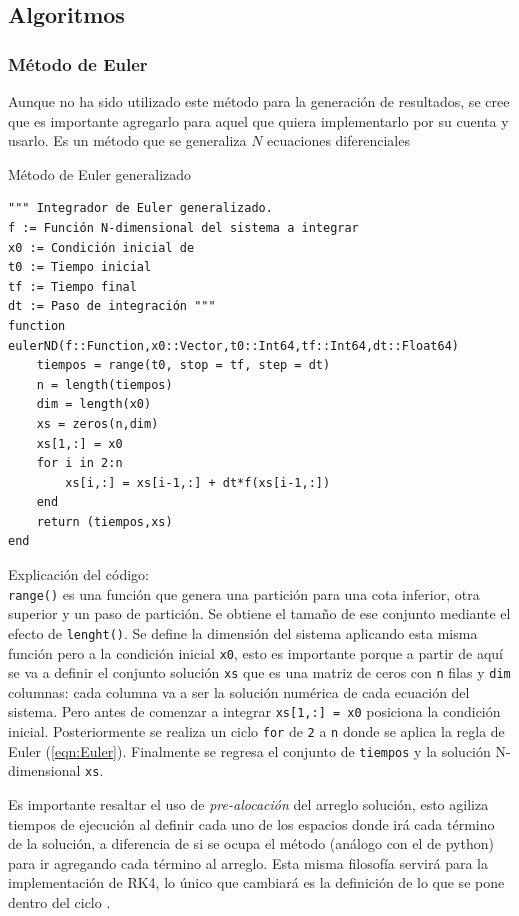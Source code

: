 \subsection{Algoritmos}\label{sec:algoritmos}

\subsubsection{Método de Euler}

Aunque no ha sido utilizado este método para la generación de resultados, se cree que es importante agregarlo para aquel que quiera implementarlo por su cuenta y usarlo. Es un método que se generaliza $N$ ecuaciones diferenciales
\begin{algorithm}
	\caption{Método de Euler generalizado}
	\label{al:Euler}
	\begin{verbatim}
""" Integrador de Euler generalizado.
f := Función N-dimensional del sistema a integrar
x0 := Condición inicial de
t0 := Tiempo inicial
tf := Tiempo final
dt := Paso de integración """
function eulerND(f::Function,x0::Vector,t0::Int64,tf::Int64,dt::Float64)          
	tiempos = range(t0, stop = tf, step = dt)
	n = length(tiempos)                      
	dim = length(x0)                         
	xs = zeros(n,dim)                        
	xs[1,:] = x0                             
	for i in 2:n 
		xs[i,:] = xs[i-1,:] + dt*f(xs[i-1,:])
	end
	return (tiempos,xs)
end
	\end{verbatim}
	Explicación del código:\\
	\texttt{range()} es una función que genera una partición para una cota inferior, otra superior y un paso de partición. Se obtiene el tamaño de ese conjunto mediante el efecto de \texttt{lenght()}. Se define la dimensión del sistema aplicando esta misma función pero a la condición inicial \texttt{x0}, esto es importante porque a partir de aquí se va a definir el conjunto solución \texttt{xs} que es una matriz de ceros con \texttt{n} filas y \texttt{dim} columnas: cada columna va a ser la solución numérica de cada ecuación del sistema. Pero antes de comenzar a integrar \texttt{xs[1,:] = x0} posiciona la condición inicial. Posteriormente se realiza un ciclo \texttt{for} de \texttt{2} a \texttt{n} donde se aplica la regla de Euler (\ref{eqn:Euler}). Finalmente se regresa el conjunto de \texttt{tiempos} y la solución N-dimensional \texttt{xs}.
\end{algorithm}
\newpage
Es importante resaltar el uso de \textit{pre-alocación} del arreglo solución, esto agiliza tiempos de ejecución al definir cada uno de los espacios donde irá cada término de la solución, a diferencia de si se ocupa el método  (análogo con el  de python) para ir agregando cada término al arreglo. Esta misma filosofía servirá para la implementación de RK4, lo único que cambiará es la definición de lo que se pone dentro del ciclo .
